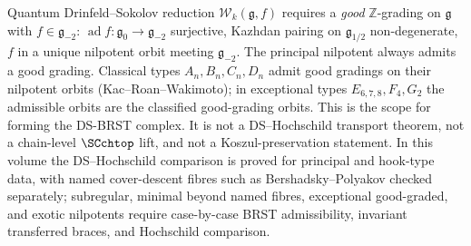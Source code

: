 \begin{remark}\label{rem:ds-good-grading-scope}
Quantum Drinfeld--Sokolov reduction $\mathcal{W}_k(\mathfrak{g}, f)$ requires a \emph{good} $\mathbb{Z}$-grading on $\mathfrak{g}$ with $f \in \mathfrak{g}_{-2}$: $\operatorname{ad} f \colon \mathfrak{g}_0 \to \mathfrak{g}_{-2}$ surjective, Kazhdan pairing on $\mathfrak{g}_{1/2}$ non-degenerate, $f$ in a unique nilpotent orbit meeting $\mathfrak{g}_{-2}$. The principal nilpotent always admits a good grading. Classical types $A_n, B_n, C_n, D_n$ admit good gradings on their nilpotent orbits (Kac--Roan--Wakimoto); in exceptional types $E_{6,7,8}, F_4, G_2$ the admissible orbits are the classified good-grading orbits. This is the scope for forming the DS-BRST complex. It is not a DS--Hochschild transport theorem, not a chain-level $\SCchtop$ lift, and not a Koszul-preservation statement. In this volume the DS--Hochschild comparison is proved for principal and hook-type data, with named cover-descent fibres such as Bershadsky--Polyakov checked separately; subregular, minimal beyond named fibres, exceptional good-graded, and exotic nilpotents require case-by-case BRST admissibility, invariant transferred braces, and Hochschild comparison.
\end{remark}

